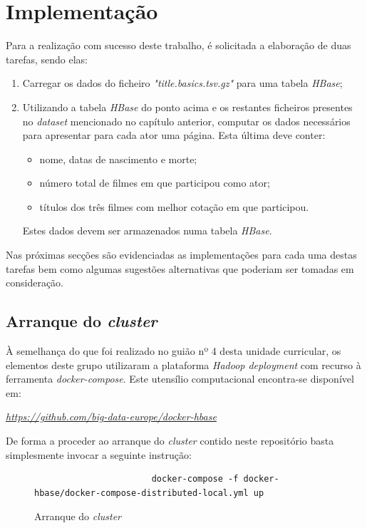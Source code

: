 \documentclass[a4paper]{report}
\begin{document}
\chapter{Implementação} \label{ch:Implementation}
\large {
	Para a realização com sucesso deste trabalho, é solicitada a elaboração de duas tarefas, sendo elas:
	\begin{enumerate}
		\item Carregar os dados do ficheiro \textit{"title.basics.tsv.gz"} para uma tabela \textit{HBase};
		\item Utilizando a tabela \textit{HBase} do ponto acima e os restantes ficheiros presentes no \textit{dataset} mencionado no capítulo anterior, computar os dados necessários para apresentar para cada ator uma página. Esta última deve conter:
		\begin{itemize}
			\item nome, datas de nascimento e morte;
			\item número total de filmes em que participou como ator;
			\item títulos dos três filmes com melhor cotação em que participou.
		\end{itemize}
		Estes dados devem ser armazenados numa tabela \textit{HBase}.
	\end{enumerate}
	
	Nas próximas secções são evidenciadas as implementações para cada uma destas tarefas bem como algumas sugestões alternativas que poderiam ser tomadas em consideração.
	
	\section{Arranque do \textit{cluster}} \label{sec:Cluster}
		À semelhança do que foi realizado no guião nº 4 desta unidade curricular, os elementos deste grupo utilizaram a plataforma \textit{Hadoop deployment} com recurso à ferramenta \textit{docker-compose}. Este utensílio computacional encontra-se disponível em:
		\begin{center}
			\textit{\url{https://github.com/big-data-europe/docker-hbase}}
		\end{center}

		De forma a proceder ao arranque do \textit{cluster} contido neste repositório basta simplesmente invocar a seguinte instrução:
		\begin{figure}[H]
			{
				\color{teal}
				\begin{verbatim}
				       docker-compose -f docker-hbase/docker-compose-distributed-local.yml up
				\end{verbatim}
			}
			\caption{Arranque do \textit{cluster}}
            \label{fig:1}
		\end{figure}

}
\end{document}
